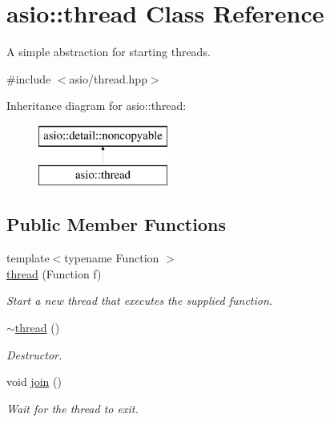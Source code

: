 \hypertarget{classasio_1_1thread}{}\section{asio\+:\+:thread Class Reference}
\label{classasio_1_1thread}


A simple abstraction for starting threads.  




{\ttfamily \#include $<$asio/thread.\+hpp$>$}

Inheritance diagram for asio\+:\+:thread\+:\begin{figure}[H]
\begin{center}
\leavevmode
\includegraphics[height=2.000000cm]{classasio_1_1thread}
\end{center}
\end{figure}
\subsection*{Public Member Functions}
\begin{DoxyCompactItemize}
\item 
{\footnotesize template$<$typename Function $>$ }\\\hyperlink{classasio_1_1thread_aa95ee0c85cd4c4d61032ada1ad7b25d2}{thread} (Function f)
\begin{DoxyCompactList}\small\item\em Start a new thread that executes the supplied function. \end{DoxyCompactList}\item 
\hyperlink{classasio_1_1thread_a961abee6eb9ead8692936d97661a859b}{$\sim$thread} ()
\begin{DoxyCompactList}\small\item\em Destructor. \end{DoxyCompactList}\item 
void \hyperlink{classasio_1_1thread_a6c3ea0ac62ce8da7a21ed1a055b7b659}{join} ()
\begin{DoxyCompactList}\small\item\em Wait for the thread to exit. \end{DoxyCompactList}\end{DoxyCompactItemize}


